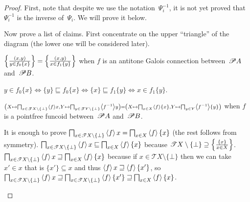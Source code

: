 \begin{proof}
First, note that despite we use the notation~$\Psi_i^{-1}$, it is not yet proved that~$\Psi_i^{-1}$ is the inverse of~$\Psi_i$. We will prove it below.

Now prove a list of claims. First concentrate on the upper ``triangle'' of the diagram (the lower one will be considered later).

\begin{claim}
$\left\{ \frac{(x,y)}{y\in f_0\{x\}}\right\}=\left\{ \frac{(x,y)}{x\in f_1\{y\}}\right\}$ when $f$ is an antitone Galois connection between~$\mathscr{P} A$ and~$\mathscr{P} B$.
\end{claim}
\begin{claimproof}
$y\in f_0\{x\}\Leftrightarrow\{y\}\sqsubseteq f_0\{x\}\Leftrightarrow\{x\}\sqsubseteq f_1\{y\}\Leftrightarrow x\in f_1\{y\}$.
\end{claimproof}

\begin{claim}
$\scriptstyle \left(X\mapsto\bigsqcap_{x\in\mathscr{T} X\setminus\{\bot\}}\left\langle f\right\rangle x,Y\mapsto\bigsqcap_{y\in\mathscr{T} Y\setminus\{\bot\}}\left\langle f^{-1}\right\rangle y\right)=
\left(X\mapsto\bigsqcap_{x\in X}\left\langle f\right\rangle\{x\},Y\mapsto\bigsqcap_{y\in Y}\left\langle f^{-1}\right\rangle\{y\}\right)$
when $f$ is a pointfree funcoid between~$\mathscr{P} A$ and~$\mathscr{P} B$.
\end{claim}
\begin{claimproof}
It is enough to prove $\bigsqcap_{x\in\mathscr{T} X\setminus\{\bot\}}\left\langle f\right\rangle x = \bigsqcap_{x\in X}\left\langle f\right\rangle\{x\}$ (the rest follows from symmetry).
$\bigsqcap_{x\in\mathscr{T} X\setminus\{\bot\}}\left\langle f\right\rangle x \sqsubseteq \bigsqcap_{x\in X}\left\langle f\right\rangle\{x\}$ because
$\mathscr{T} X\setminus\{\bot\}\supseteq\left\{ \frac{\{x\}}{x\in X}\right\}$.
$\bigsqcap_{x\in\mathscr{T} X\setminus\{\bot\}}\left\langle f\right\rangle x \sqsupseteq \bigsqcap_{x\in X}\left\langle f\right\rangle\{x\}$ because
if $x\in\mathscr{T} X\setminus\{\bot\}$ then we can take $x'\in x$ that is $\{x'\}\subseteq x$ and thus
$\left\langle f\right\rangle x \sqsupseteq \left\langle f\right\rangle\{x'\}$, so
$\bigsqcap_{x\in\mathscr{T} X\setminus\{\bot\}}\left\langle f\right\rangle x \sqsupseteq \bigsqcap_{x\in\mathscr{T} X\setminus\{\bot\}}\left\langle f\right\rangle\{x'\} \sqsupseteq
\bigsqcap_{x\in X}\left\langle f\right\rangle\{x\}$.
\end{claimproof}


\end{proof}
